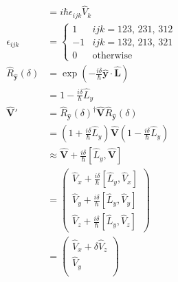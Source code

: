 \documentclass{article}
\renewcommand{\vec}[1]{\boldsymbol{\mathbf{#1}}}
\newcommand{\uvec}[1]{\hat{\vec{#1}}}
\begin{document}
\begin{align*}
  [\hat{L}_i, \hat{V}_j]     & = i \hbar \epsilon_{i j k} \hat{V}_k                                                                               \\
  \epsilon_{i j k}           & = \begin{cases}
                                   1  & i j k = 123, \,231, \,312 \\
                                   -1 & i j k = 132, \,213, \,321 \\
                                   0  & \text{otherwise}
                                 \end{cases}                                                                                   \\
  \hat{R}_{\uvec{y}}(\delta) & = \exp \left( -\frac{i \delta}{\hbar} \uvec{y} \cdot \uvec{L} \right)                                              \\
                             & = 1 - \frac{i \delta}{\hbar} \hat{L}_y                                                                             \\
  \uvec{V}'                  & = \hat{R}_{\uvec{y}}(\delta)^\dagger \uvec{V} \hat{R}_{\uvec{y}}(\delta)                                           \\
                             & = \left( 1 + \frac{i \delta}{\hbar} \hat{L}_y \right) \uvec{V} \left( 1 - \frac{i \delta}{\hbar} \hat{L}_y \right) \\
                             & \approx \uvec{V} + \frac{i \delta}{\hbar} [\hat{L}_y, \uvec{V}]                                                    \\
                             & = \begin{pmatrix}
                                   \hat{V}_x + \frac{i \delta}{\hbar} [\hat{L}_y, \hat{V}_x] \\
                                   \hat{V}_y + \frac{i \delta}{\hbar} [\hat{L}_y, \hat{V}_y] \\
                                   \hat{V}_z + \frac{i \delta}{\hbar} [\hat{L}_y, \hat{V}_z]
                                 \end{pmatrix}                          \\
                             & = \begin{pmatrix}
                                   \hat{V}_x + \delta \hat{V}_z \\
                                   \hat{V}_y                    \\

\end{pmatrix}
\end{align*}
\end{document}
